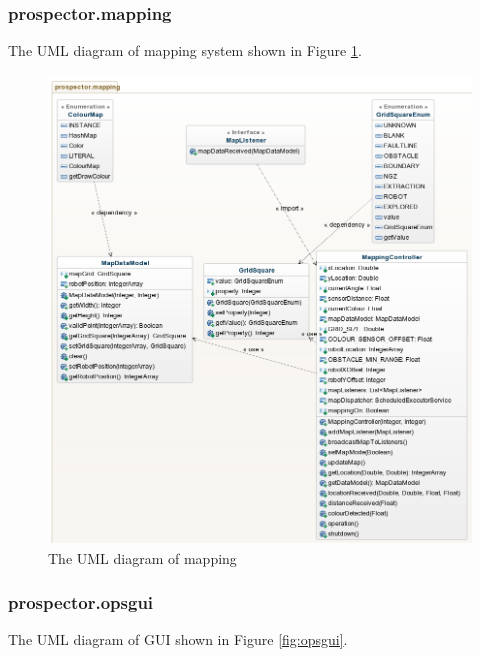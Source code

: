 \documentclass[12pt]{article}
\begin{document}
\subsubsection{prospector.mapping}
The UML diagram of mapping system shown in Figure \ref{fig:mapping}.

\begin{figure}[!htb]
\includegraphics[width=\textwidth]{mapping.png}
\caption{The UML diagram of mapping }
  \label{fig:mapping}
\end{figure}

\subsubsection{prospector.opsgui}
The UML diagram of GUI shown in Figure \ref{fig:opsgui}.
\end{document}
